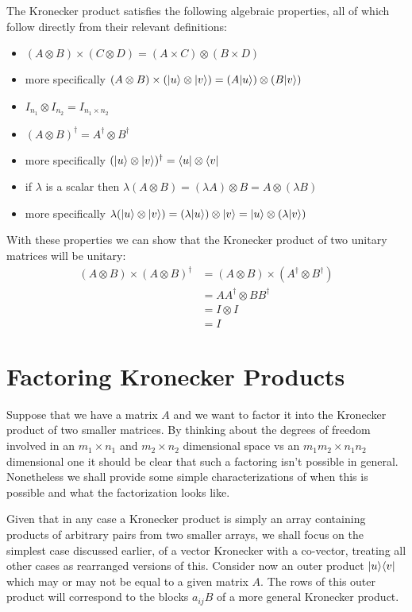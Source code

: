The Kronecker product satisfies the following algebraic properties, all of which follow directly from their relevant definitions:
\begin{itemize}
	\item $(A\otimes B) \times (C \otimes D) = (A\times C) \otimes (B \times D)$
	\item more specifically $(A\otimes B) \times (| u \rangle \otimes | v \rangle) = (A| u \rangle)\otimes (B| v \rangle)$
	\item $I_{n_1} \otimes I_{n_2} = I_{n_1\times n_2}$
	\item $(A\otimes B)^\dagger = A^\dagger \otimes B^\dagger$
	\item more specifically $(| u \rangle\otimes | v \rangle)^\dagger = \langle u | \otimes \langle v |$
	\item if $\lambda$ is a scalar then $\lambda (A \otimes B) = (\lambda A) \otimes B = A \otimes (\lambda B)$
	\item more specifically $\lambda (| u \rangle \otimes | v \rangle) = (\lambda | u \rangle) \otimes | v \rangle = | u \rangle \otimes (\lambda | v \rangle)$
\end{itemize}
With these properties we can show that the Kronecker product of two unitary matrices will be unitary:
\begin{align*}
(A \otimes B) \times (A \otimes B)^\dagger
&= (A \otimes B) \times (A^\dagger \otimes B^\dagger)
\\&= AA^\dagger \otimes BB^\dagger
\\&= I \otimes I
\\&= I
\end{align*}
\section{Factoring Kronecker Products}
Suppose that we have a matrix $A$ and we want to factor it into the Kronecker product of two smaller matrices. By thinking about the degrees of freedom involved in an $m_1 \times n_1$ and $m_2 \times n_2$ dimensional space vs an $m_1m_2 \times n_1n_2$ dimensional one it should be clear that such a factoring isn't possible in general. Nonetheless we shall provide some simple characterizations of when this is possible and what the factorization looks like.

Given that in any case a Kronecker product is simply an array containing products of arbitrary pairs from two smaller arrays, we shall focus on the simplest case discussed earlier, of a vector Kronecker with a co-vector, treating all other cases as rearranged versions of this. Consider now an outer product $| u \rangle\langle v |$ which may or may not be equal to a given matrix $A$. The rows of this outer product will correspond to the blocks $a_{ij}B$ of a more general Kronecker product.

